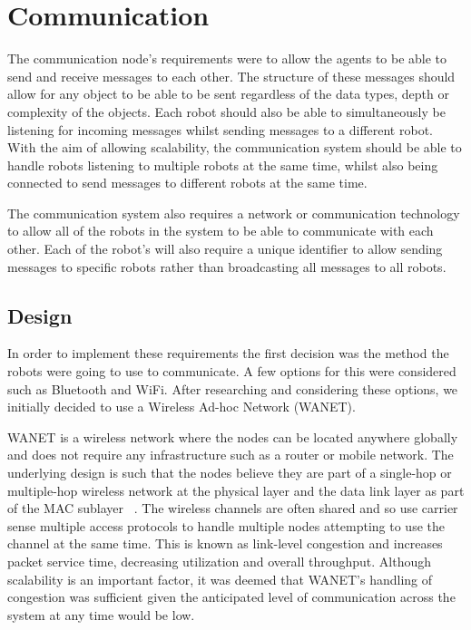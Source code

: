 \section{Communication}\label{soft/comms}
The communication node's requirements were to allow the agents to
be able to send and receive messages to each other. The structure
of these messages should allow for any object to be able to be sent
regardless of the data types, depth or complexity of the objects.
Each robot should also be able to simultaneously be listening for
incoming messages whilst sending messages to a different robot.
With the aim of allowing scalability, the communication system
should be able to handle robots listening to multiple robots at the
same time, whilst also being connected to send messages to different
robots at the same time.

The communication system also requires a network or communication
technology to allow all of the robots in the system to be able to
communicate with each other. Each of the robot's will also require
a unique identifier to allow sending messages to specific robots
rather than broadcasting all messages to all robots.

\subsection{Design}\label{soft/comms/design}
In order to implement these requirements the first decision was the
method the robots were going to use to communicate. A few options
for this were considered such as Bluetooth and WiFi. After
researching  and considering these options, we initially decided to
use a Wireless Ad-hoc Network (WANET).

WANET is a wireless network where the nodes can be located anywhere
globally and does not require any infrastructure such as a router or
mobile network. The underlying design is such that the nodes believe
they are part of a single-hop or multiple-hop wireless network at the
physical layer and the data link layer as part of the MAC sublayer~
\cite{rajesh2015congestion}. The wireless channels are often shared
and so use carrier sense multiple access protocols to handle multiple
nodes attempting to use the channel at the same time. This is known
as link-level congestion and increases packet service time,
decreasing utilization and overall throughput. Although scalability
is an important  factor, it was deemed that WANET's handling of
congestion was sufficient given the anticipated level of
communication across the system at any time would be low.

